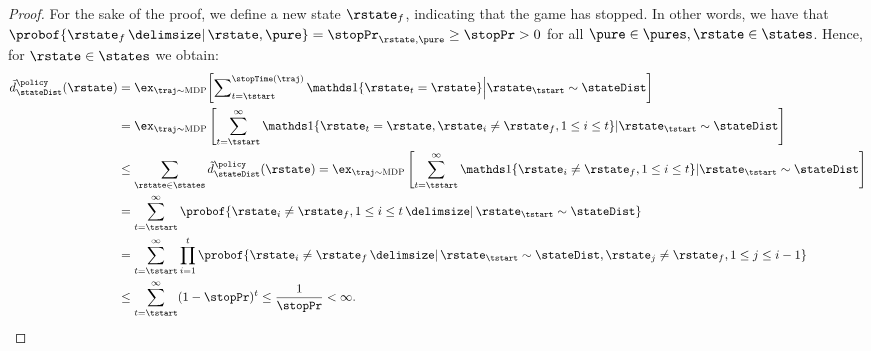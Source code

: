 \begin{proof}
For the sake of the proof, we define a new state $\rstate_f$, indicating that the game has stopped. In other words, we have that $\probof{\rstate_f \given \rstate, \pure} = \stopPr_{\rstate,\pure} \geq \stopPr >0$ for all $\pure \in \pures, \rstate \in \states$. Hence, for $\rstate \in \states$ we obtain:
\begin{align*}
\visitMeas{\stateDist}{\policy}\parens{\rstate} &=\ex_{\traj \sim \MDP}\bracks*{\insum_{\time =\tstart}^{\stopTime\parens{\traj}}\one\braces{\rstate_{\time}=\rstate} \Big| \rstate_\tstart \sim \stateDist}
	\notag\\
	&=\ex_{\traj \sim \MDP}\left[\sum_{\time=\tstart}^{\infty}\one\{\rstate_\time = \rstate, \rstate_{i} \neq \rstate_f,  1 \leq i \leq t\} \vert \rstate_\tstart \sim \stateDist\right]
	\notag\\
	&\leq \sum_{\rstate\in\states} \visitMeas{\stateDist}{\policy}\parens{\rstate}
	=\ex_{\traj \sim \MDP}\left[\sum_{\time=\tstart}^{\infty}\one\{\rstate_{i} \neq \rstate_f,  1 \leq i \leq \time\} \vert \rstate_\tstart \sim \stateDist\right]
	\notag\\
	&= \sum_{\time=\tstart}^{\infty}\probof{\rstate_{i} \neq \rstate_f,  1 \leq i \leq t \given \rstate_\tstart \sim \stateDist}
	\notag\\
	&= \sum_{\time=\tstart}^{\infty} \prod_{i = 1}^{\time} \probof{\rstate_{i} \neq \rstate_f \given \rstate_\tstart \sim \stateDist, \rstate_{j} \neq \rstate_f, 1 \leq j \leq i-1}
	\notag\\
	&\leq \sum_{\time=\tstart}^{\infty} (1-\stopPr)^{\time}\leq \frac{1}{\stopPr}
	< \infty.
	\qedhere
\end{align*}
\end{proof}

\ConversionLemma*

